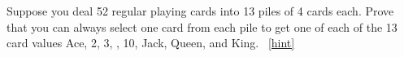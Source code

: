 \documentclass{book}
\begin{document}
\setcounter{project}{61}
\addtocounter{project}{-1}
\begin{activity}[]\label{activity-54}
\hypertarget{p-486}{}%
Suppose you deal 52 regular playing cards into 13 piles of 4 cards each. Prove that you can always select one card from each pile to get one of each of the 13 card values Ace, 2, 3, \textellipsis{}, 10, Jack, Queen, and King.%
~\hfill{\tiny\hyperlink{a-61}{[hint]}\hypertarget{q-61}{}}\end{activity}
\end{document}

